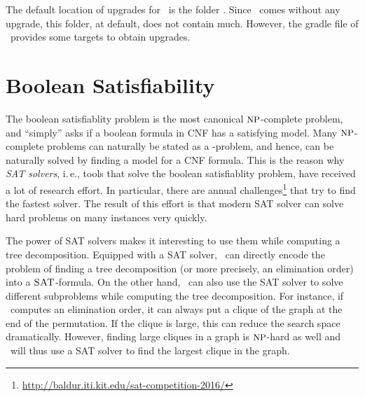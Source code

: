 \documentclass[a4paper, ukenglish, twoside, openright]{jdrasilmanual}
\begin{document}
The default location of upgrades for \Jdrasil\ is the folder
. Since \Jdrasil\ comes
without any upgrade, this folder, at default, does not contain
much. However, the gradle file of \Jdrasil\ provides some targets
to obtain upgrades.
\begin{center}
\vfill
{}
\vfill
\end{center}
\chapter{Boolean Satisfiability}\label{upgrade:sat}
The boolean satisfiablity problem  is the most canonical
$\Class{NP}$-complete problem, and ``simply'' asks if a boolean
formula in CNF has a satisfying model. Many $\Class{NP}$-complete
problems can naturally be stated as a -problem, and hence, can
be naturally solved by finding a model for a CNF formula. This is the
reason why \emph{SAT solvers}, i.\,e., tools that solve the boolean
satisfiablity problem, have received a lot of research effort. In
particular, there are annual challenges\footnote{\url{http://baldur.iti.kit.edu/sat-competition-2016/}} that try to
find the fastest solver. The result of this effort is that modern
SAT solver can solve hard problems on many instances very quickly.

The power of SAT solvers makes it interesting to use them while
computing a tree decomposition. Equipped with a SAT solver, \Jdrasil\
can directly encode the problem of finding a tree decomposition (or
more precisely, an elimination order) into a $\Lang{SAT}$-formula. On the other hand, \Jdrasil\ can
also use the SAT solver to solve different subproblems while computing
the tree decomposition. For instance, if \Jdrasil\ computes an
elimination order, it can always put a clique of the graph at the
end of the permutation. If the clique is large, this can reduce the
search space dramatically. However, finding large cliques in a graph is
$\Class{NP}$-hard as well and \Jdrasil\ will thus use a SAT solver to find the
largest clique in the graph.
\end{document}
